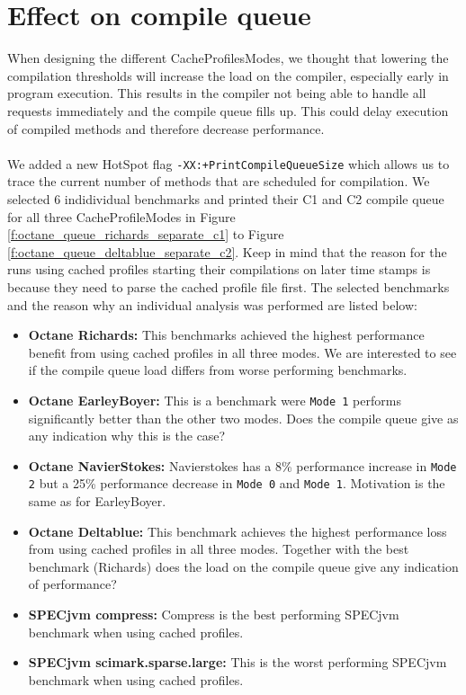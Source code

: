 \section{Effect on compile queue}
\label{s:perf_compilequeue}
When designing the different CacheProfilesModes, we thought that lowering the compilation thresholds will increase the load on the compiler, especially early in program execution. This results in the compiler not being able to handle all requests immediately and the compile queue fills up. This could delay execution of compiled methods and therefore decrease performance.
\\\\
We added a new HotSpot flag \texttt{-XX:+PrintCompileQueueSize} which allows us to trace the current number of methods that are scheduled for compilation. We selected 6 indidividual benchmarks and printed their C1 and C2 compile queue for all three CacheProfileModes in Figure \ref{f:octane_queue_richards_separate_c1} to Figure \ref{f:octane_queue_deltablue_separate_c2}.
Keep in mind that the reason for the runs using cached profiles starting their compilations on later time stamps is because they need to parse the cached profile file first.
The selected benchmarks and the reason why an individual analysis was performed are listed below:
\begin{itemize}
  \item \textbf{Octane Richards:} This benchmarks achieved the highest performance benefit from using cached profiles in all three modes. We are interested to see if the compile queue load differs from worse performing benchmarks.
  \item \textbf{Octane EarleyBoyer:} This is a benchmark were \texttt{Mode 1} performs significantly better than the other two modes. Does the compile queue give as any indication why this is the case?
  \item \textbf{Octane NavierStokes:} Navierstokes has a 8\% performance increase in \texttt{Mode 2} but a 25\% performance decrease in \texttt{Mode 0} and \texttt{Mode 1}. Motivation is the same as for EarleyBoyer.
  \item \textbf{Octane Deltablue:} This benchmark achieves the highest performance loss from using cached profiles in all three modes. Together with the best benchmark (Richards) does the load on the compile queue give any indication of performance?
  \item \textbf{SPECjvm compress:} Compress is the best performing SPECjvm benchmark when using cached profiles. 
  \item \textbf{SPECjvm scimark.sparse.large:} This is the worst performing SPECjvm benchmark when using cached profiles. 
\end{itemize}
